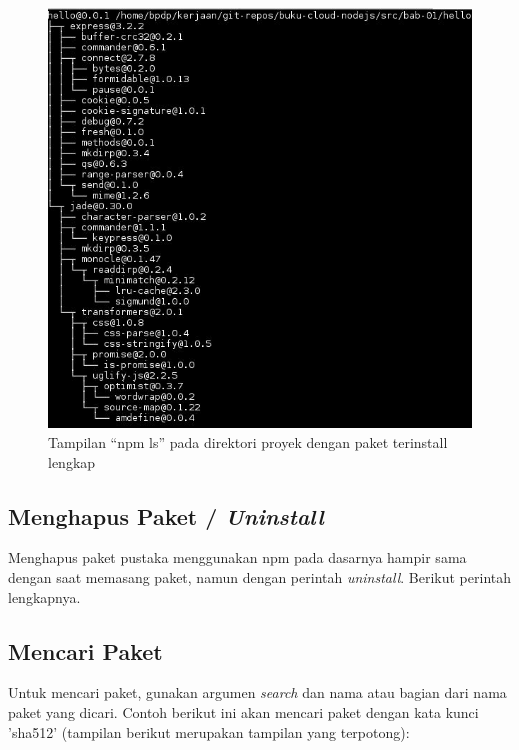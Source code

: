   \begin{figure}
    \begin{center}
      \includegraphics[scale=0.5]{images/npm-ls-paket-terinstall.jpg}
    \end{center}
    \caption{Tampilan ``npm ls'' pada direktori proyek dengan paket terinstall lengkap}
    \label{fig:npm-ls-paket-terinstall}
  \end{figure}

\subsection{Menghapus Paket / \textit{Uninstall}}

Menghapus paket pustaka menggunakan npm pada dasarnya hampir sama dengan saat memasang paket, namun dengan perintah \textit{uninstall}. Berikut perintah lengkapnya.

\lstset{language=bash,caption=Perintah menghapus paket di npm}


\subsection{Mencari Paket}

Untuk mencari paket, gunakan argumen \textit{search} dan nama atau bagian dari nama paket yang dicari. Contoh berikut ini akan mencari paket dengan kata kunci 'sha512' (tampilan berikut merupakan tampilan yang terpotong):

